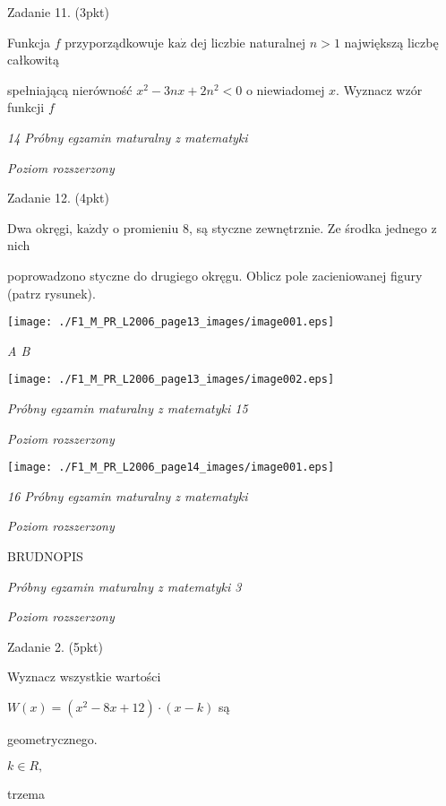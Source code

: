 \documentclass[a4paper,12pt]{article}
\begin{document}
Zadanie 11. (3pkt)

Funkcja $f$ przyporządkowuje $\mathrm{k}\mathrm{a}\dot{\mathrm{z}}$ dej liczbie naturalnej $n>1$ największą liczbę całkowitą

spełniającą nierówność $x^{2}-3nx+2n^{2}<0$ o niewiadomej $x$. Wyznacz wzór funkcji $f$





{\it 14 Próbny egzamin maturalny z matematyki}

{\it Poziom rozszerzony}

Zadanie 12. (4pkt)

Dwa okręgi, $\mathrm{k}\mathrm{a}\dot{\mathrm{z}}\mathrm{d}\mathrm{y}$ o promieniu 8, są styczne zewnętrznie. Ze środka jednego z nich

poprowadzono styczne do drugiego okręgu. Oblicz pole zacieniowanej figury (patrz rysunek).
\begin{center}
\texttt{[image: ./F1\_M\_PR\_L2006\_page13\_images/image001.eps]}
\end{center}
{\it A  B}
\begin{center}
\texttt{[image: ./F1\_M\_PR\_L2006\_page13\_images/image002.eps]}
\end{center}




{\it Próbny egzamin maturalny z matematyki 15}

{\it Poziom rozszerzony}
\begin{center}
\texttt{[image: ./F1\_M\_PR\_L2006\_page14\_images/image001.eps]}
\end{center}




{\it 16 Próbny egzamin maturalny z matematyki}

{\it Poziom rozszerzony}

BRUDNOPIS





{\it Próbny egzamin maturalny z matematyki 3}

{\it Poziom rozszerzony}

Zadanie 2. (5pkt)

Wyznacz wszystkie wartości

$W(x)=(x^{2}-8x+12)\cdot(x-k)$ są

geometrycznego.

$k\in R,$

trzema
\end{document}
